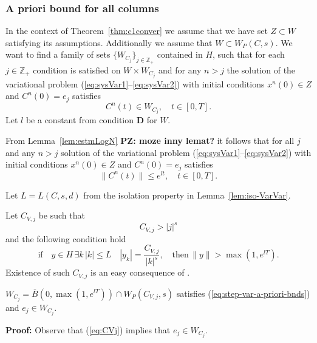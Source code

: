 \subsubsection{A priori bound for all columns}

In the context of Theorem~\ref{thm:c1conver}  we assume that we have set $Z\subset W$ satisfying its assumptions. Additionally we assume that $W \subset W_P(C,s)$.
We want to find  a family of sets $\{W_{C_j}\}_{j \in \mathbb{Z}_+}$ contained in $H$, such that for each $j \in \mathbb{Z}_+$ condition \VL is satisfied on $W \times W_{C_j}$ and
for any $n >j$ the solution of the variational problem (\ref{eq:sysVar1}--\ref{eq:sysVar2}) with initial conditions $x^n(0) \in Z$ and $C^n(0)=e_j$ satisfies
\begin{equation}
  C^n(t) \in W_{C_j}, \quad t \in [0,T]. \label{eq:step-var-a-priori-bnds}
\end{equation}
Let $l$ be a constant from condition \textbf{D} for $W$.

From Lemma~\ref{lem:estmLogN} \textbf{PZ: moze inny lemat?} it follows that for all $j$ and any $n>j$ solution of the variational problem (\ref{eq:sysVar1}--\ref{eq:sysVar2}) with initial conditions $x^n(0) \in Z$ and $C^n(0)=e_j$ satisfies
\begin{equation}
  \|C^n(t)\| \leq e^{lt}, \quad t \in [0,T]. \label{eq:ln-estm-var}
\end{equation}

Let $L=L(C,s,d)$ from the isolation property in Lemma~\ref{lem:iso-VarVar}.


Let $C_{V,j}$ be such that
\begin{equation}
  C_{V,j} > |j|^s  \label{eq:CVj}
\end{equation}
and the following condition hold 
\begin{equation}
\mbox{if} \quad  y \in H \, \exists k \,  |k|\leq L \quad |y_k|=\frac{C_{V,j}}{|k|^s}, \quad \mbox{then} \, \|y\| > \max(1,e^{lT}).  \label{eq:iso-cond-v}
\end{equation}
Existence of such $C_{V,j}$ is an easy consequence of .



\begin{lemma}
\label{lem:WCj-exist}
  $W_{C_j}=\overline{B}(0,\max(1,e^{lT})) \cap W_P(C_{V,j},s)$ satisfies (\ref{eq:step-var-a-priori-bnds}) and $e_j \in W_{C_j}$.
\end{lemma}
\textbf{Proof:}
Observe that (\ref{eq:CVj}) implies that $e_j \in W_{C_j}$.

